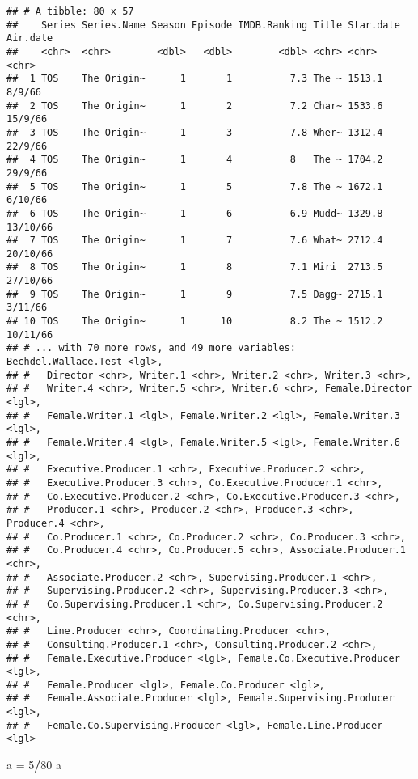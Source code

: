 \documentclass[
]{article}
\newenvironment{Shaded}{\begin{snugshade}}{\end{snugshade}}
\newcommand{\DecValTok}[1]{\textcolor[rgb]{0.00,0.00,0.81}{#1}}
\newcommand{\NormalTok}[1]{#1}
\newcommand{\OperatorTok}[1]{\textcolor[rgb]{0.81,0.36,0.00}{\textbf{#1}}}
\newcommand{\StringTok}[1]{\textcolor[rgb]{0.31,0.60,0.02}{#1}}
\begin{document}
\begin{verbatim}
## # A tibble: 80 x 57
##    Series Series.Name Season Episode IMDB.Ranking Title Star.date Air.date
##    <chr>  <chr>        <dbl>   <dbl>        <dbl> <chr> <chr>     <chr>   
##  1 TOS    The Origin~      1       1          7.3 The ~ 1513.1    8/9/66  
##  2 TOS    The Origin~      1       2          7.2 Char~ 1533.6    15/9/66 
##  3 TOS    The Origin~      1       3          7.8 Wher~ 1312.4    22/9/66 
##  4 TOS    The Origin~      1       4          8   The ~ 1704.2    29/9/66 
##  5 TOS    The Origin~      1       5          7.8 The ~ 1672.1    6/10/66 
##  6 TOS    The Origin~      1       6          6.9 Mudd~ 1329.8    13/10/66
##  7 TOS    The Origin~      1       7          7.6 What~ 2712.4    20/10/66
##  8 TOS    The Origin~      1       8          7.1 Miri  2713.5    27/10/66
##  9 TOS    The Origin~      1       9          7.5 Dagg~ 2715.1    3/11/66 
## 10 TOS    The Origin~      1      10          8.2 The ~ 1512.2    10/11/66
## # ... with 70 more rows, and 49 more variables: Bechdel.Wallace.Test <lgl>,
## #   Director <chr>, Writer.1 <chr>, Writer.2 <chr>, Writer.3 <chr>,
## #   Writer.4 <chr>, Writer.5 <chr>, Writer.6 <chr>, Female.Director <lgl>,
## #   Female.Writer.1 <lgl>, Female.Writer.2 <lgl>, Female.Writer.3 <lgl>,
## #   Female.Writer.4 <lgl>, Female.Writer.5 <lgl>, Female.Writer.6 <lgl>,
## #   Executive.Producer.1 <chr>, Executive.Producer.2 <chr>,
## #   Executive.Producer.3 <chr>, Co.Executive.Producer.1 <chr>,
## #   Co.Executive.Producer.2 <chr>, Co.Executive.Producer.3 <chr>,
## #   Producer.1 <chr>, Producer.2 <chr>, Producer.3 <chr>, Producer.4 <chr>,
## #   Co.Producer.1 <chr>, Co.Producer.2 <chr>, Co.Producer.3 <chr>,
## #   Co.Producer.4 <chr>, Co.Producer.5 <chr>, Associate.Producer.1 <chr>,
## #   Associate.Producer.2 <chr>, Supervising.Producer.1 <chr>,
## #   Supervising.Producer.2 <chr>, Supervising.Producer.3 <chr>,
## #   Co.Supervising.Producer.1 <chr>, Co.Supervising.Producer.2 <chr>,
## #   Line.Producer <chr>, Coordinating.Producer <chr>,
## #   Consulting.Producer.1 <chr>, Consulting.Producer.2 <chr>,
## #   Female.Executive.Producer <lgl>, Female.Co.Executive.Producer <lgl>,
## #   Female.Producer <lgl>, Female.Co.Producer <lgl>,
## #   Female.Associate.Producer <lgl>, Female.Supervising.Producer <lgl>,
## #   Female.Co.Supervising.Producer <lgl>, Female.Line.Producer <lgl>
\end{verbatim}

\begin{Shaded}
\begin{Highlighting}[]
\NormalTok{a =}\StringTok{ }\DecValTok{5}\OperatorTok{/}\DecValTok{80}
\NormalTok{a}
\end{Highlighting}
\end{Shaded}
\end{document}
